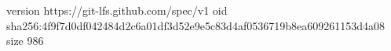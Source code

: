 version https://git-lfs.github.com/spec/v1
oid sha256:4f9f7d0df042484d2c6a01df3d52e9e5c83d4af0536719b8ea609261153d4a08
size 986
